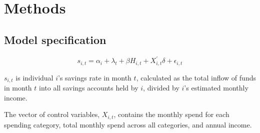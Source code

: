
\section{Methods}%
\label{sec:methods}



\subsection{Model specification}%
\label{sub:model_specification}



\begin{equation}
    s_{i,t} = \alpha_i + \lambda_t + \beta H_{i,t} + X^\prime_{i,t} \delta + \epsilon_{i,t}
\end{equation}

$s_{i,t}$ is individual $i$'s savings rate in month $t$, calculated as the
total inflow of funds in month $t$ into all savings accounts held by $i$,
divided by $i$'s estimated monthly income.

The vector of control variables, $X_{i,t}$, contains the monthly spend for each
spending category, total monthly spend across all categories, and annual income.




